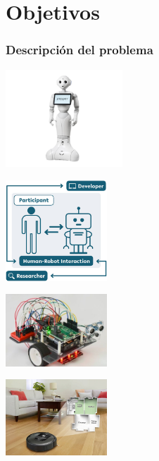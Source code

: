 \documentclass{beamer}
\begin{document}
\section{Objetivos}
\begin{frame}
\frametitle{Descripción del problema}
\centering

\begin{minipage}{0.45\textwidth}
    \centering
    \includegraphics[width=4.4cm]{figs/peper.jpg}
\end{minipage}
\hfill
\begin{minipage}{0.45\textwidth}
    \centering
    \includegraphics[width=3.8cm]{figs/hri.jpg}
\end{minipage}

\vspace{0.5cm} %

\begin{minipage}{0.45\textwidth}
    \centering
    \includegraphics[width=3.8cm]{figs/robot_rasp.jpg} %
\end{minipage}
\hfill
\begin{minipage}{0.45\textwidth}
    \centering
    \includegraphics[width=3.8cm]{figs/rumba.jpg} %
\end{minipage}

\end{frame}
\end{document}

